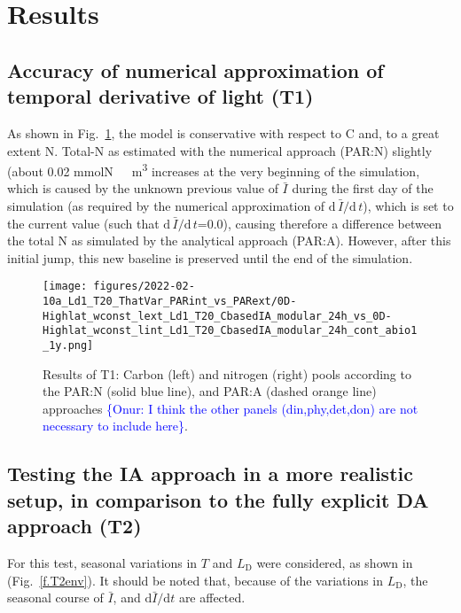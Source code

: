\documentclass[gmd, manuscript]{copernicus}
\newcommand{\onur}[1]{\textcolor{blue}{\{Onur: #1\}}}
\begin{document}

\section{Results}

\subsection{Accuracy of numerical approximation of temporal derivative of light (T1)}\label{s.resT1}
As shown in Fig.~\ref{f.T1res}, the model is conservative with respect to C and, to a great extent N\@. Total-N as estimated with the numerical approach (PAR:N) slightly (about 0.02 \unit{mmolN\ m^3} increases at the very beginning of the simulation, which is caused by the unknown previous value of $\bar{I}$ during the first day of the simulation (as required by the numerical approximation of $\text{d}\,\bar{I}/\text{d}\,t$), which is set to the current value (such that $\text{d}\,\bar{I}/\text{d}\,t$=0.0), causing therefore a difference between the total N as simulated by the analytical approach (PAR:A). However, after this initial jump, this new baseline is preserved until the end of the simulation.

\begin{figure}[ht!]
\texttt{[image: figures/2022-02-10a\_Ld1\_T20\_ThatVar\_PARint\_vs\_PARext/0D-Highlat\_wconst\_lext\_Ld1\_T20\_CbasedIA\_modular\_24h\_vs\_0D-Highlat\_wconst\_lint\_Ld1\_T20\_CbasedIA\_modular\_24h\_cont\_abio1\_1y.png]}
\caption{Results of T1: Carbon (left) and nitrogen (right) pools according to the PAR:N (solid blue line), and PAR:A (dashed orange line) approaches \onur{I think the other panels (din,phy,det,don) are not necessary to include here}.\label{f.T1res}}
\end{figure}

\FloatBarrier

\subsection{Testing the IA approach in a more realistic setup, in comparison to the fully explicit DA approach (T2)}\label{s.resT2}

For this test, seasonal variations in $T$ and $L_{\text{D}}$ were considered, as shown in (Fig.~\ref{f.T2env}). It should be noted that, because of the variations in $L_{\text{D}}$, the seasonal course of $\bar{I}$, and $\text{d}\bar{I}/\text{d}t$ are affected.
\end{document}
